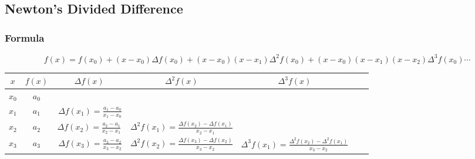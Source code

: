 \newpage
\subsection{Newton's Divided Difference}

\subsubsection{Formula}
\[f(x) = f(x_0) + (x - x_0) \Delta f(x_0) + (x - x_0)(x - x_1) \Delta^2 f(x_0) + (x - x_0)(x - x_1)(x - x_2) \Delta^3 f(x_0) \cdots\]

\begin{center}
    \begin{tabular}{|c|c|c|c|c|c|c|}
        \hline
        $x$ & $f(x)$ & $\Delta f(x)$ & $\Delta^2 f(x)$ & $\Delta^3 f(x)$\\
        \hline
        $x_0$ & $a_0$ & & &\\
        \hline
        $x_1$ & $a_1$ & $\ \Delta f(x_1) = \frac{a_1 - a_0}{x_1 - x_0}$ & &\\
        \hline
        $x_2$ & $a_2$ & $ \Delta f(x_2) = \frac{a_2 - a_1}{x_2 - x_1}$ & $\Delta^2 f(x_1) = \frac{\Delta f(x_2) - \Delta f(x_1)}{x_2 - x_1}$ & \\
        \hline
        $x_3$ & $a_3$ & $\ \Delta f(x_3) = \frac{a_3 - a_2}{x_3 - x_2}$ & $\Delta^2 f(x_2) = \frac{\Delta f(x_3) - \Delta f(x_2)}{x_3 - x_2}$ & $\Delta^3 f(x_1) = \frac{\Delta^2 f(x_2) - \Delta^2 f(x_1)}{x_3 - x_2}$\\
        \hline
    \end{tabular}
\end{center}

